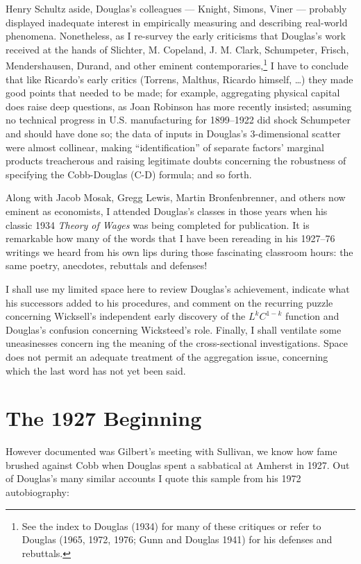 \documentclass{article}
\begin{document}
Henry Schultz aside, Douglas's colleagues --- Knight, Simons, Viner --- probably displayed inadequate interest in empirically measuring and describing real-world phenomena. Nonetheless, as I re-survey the early criticisms that Douglas's work received at the hands of Slichter, M. Copeland, J. M. Clark, Schumpeter, Frisch, Mendershausen, Durand, and other eminent contemporaries,\footnote{See the index to Douglas (1934) for many of these critiques or refer to Douglas (1965, 1972, 1976; Gunn and Douglas 1941) for his defenses and rebuttals.} I have to conclude that like Ricardo's early critics (Torrens, Malthus, Ricardo himself, \dots) they made good points that needed to be made; for example, aggregating physical capital does raise deep questions, as Joan Robinson has more recently insisted; assuming no technical progress in U.S. manufacturing for 1899--1922 did shock Schumpeter and should have done so; the data of inputs in Douglas's 3-dimensional scatter were almost collinear, making ``identification'' of separate factors' marginal products treacherous and raising legitimate doubts concerning the robustness of specifying the Cobb-Douglas (C-D) formula; and so forth.

Along with Jacob Mosak, Gregg Lewis, Martin Bronfenbrenner, and others now eminent as economists, I attended Douglas's classes in those years when his classic 1934 \emph{Theory of Wages} was being completed for publication. It is remarkable how many of the words that I have been rereading in his 1927--76 writings we heard from his own lips during those fascinating classroom hours: the same poetry, anecdotes, rebuttals and defenses!

I shall use my limited space here to review Douglas's achievement, indicate what his successors added to his procedures, and comment on the recurring puzzle concerning Wicksell's independent early discovery of the \(L^kC^{1-k}\) function and Douglas's confusion concerning Wicksteed's role. Finally, I shall ventilate some uneasinesses concern%
ing the meaning of the cross-sectional investigations. Space does not permit an adequate treatment of the aggregation issue, concerning which the last word has not yet been said.

\section*{The 1927 Beginning}

However documented was Gilbert's meeting with Sullivan, we know how fame brushed against Cobb when Douglas spent a sabbatical at Amherst in 1927. Out of Douglas's many similar accounts I quote this sample from his 1972 autobiography:
\end{document}

